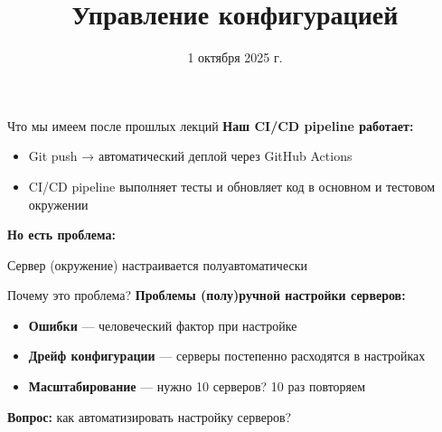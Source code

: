 \documentclass[aspectratio=169]{beamer}
\title{Управление конфигурацией}
\date{1 октября 2025 г.}
\begin{document}
    \maketitle

    \begin{frame}{Что мы имеем после прошлых лекций}
        \textbf{Наш CI/CD pipeline работает:}
        
        \begin{itemize}
            \item Git push → автоматический деплой через GitHub Actions
            \item CI/CD pipeline выполняет тесты и обновляет код в основном и тестовом окружении
        \end{itemize}

        \textbf{Но есть проблема:}

        Сервер (окружение) настраивается полуавтоматически
    \end{frame}

    \begin{frame}{Почему это проблема?}
        \textbf{Проблемы (полу)ручной настройки серверов:}
        
        \begin{itemize}
            \item \textbf{Ошибки} — человеческий фактор при настройке
            \item \textbf{Дрейф конфигурации} — серверы постепенно расходятся в настройках
            \item \textbf{Масштабирование} — нужно 10 серверов? 10 раз повторяем
        \end{itemize}
        
        \vspace{0.5cm}
        
        \textbf{Вопрос:} как автоматизировать настройку серверов?
    \end{frame}
\end{document}
